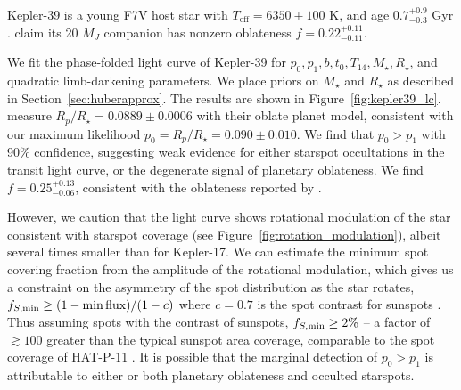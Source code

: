 Kepler-39 is a young F7V host star with $T_\mathrm{eff} = 6350 \pm 100$ K, and age $0.7^{+0.9}_{-0.3}$ Gyr \citep{Mamajek2008, Bonomo2015}. \citet{Zhu2014} claim its 20 $M_J$ companion has nonzero oblateness $f = 0.22^{+0.11}_{-0.11}$.

We fit the phase-folded \kepler light curve of Kepler-39 for $p_0, p_1, b, t_0, T_{14}, M_\star, R_\star$, and quadratic limb-darkening parameters. We place priors on $M_\star$ and $R_\star$ as described in Section~\ref{sec:huberapprox}. The results are shown in Figure~\ref{fig:kepler39_lc}. \citet{Zhu2014} measure $R_p/R_\star = 0.0889 \pm 0.0006$ with their oblate planet model, consistent with our maximum likelihood $p_0 = R_p/R_\star = 0.090 \pm 0.010$. We find that $p_0 > p_1$ with 90\% confidence, suggesting weak evidence for either starspot occultations in the transit light curve, or the degenerate signal of planetary oblateness. We find $f = {0.25}^{+0.13}_{-0.06}$, consistent with the oblateness reported by \citet{Zhu2014}.

However, we caution that the \kepler light curve shows rotational modulation of the star consistent with starspot coverage (see Figure~\ref{fig:rotation_modulation}), albeit several times smaller than for Kepler-17. We can estimate the minimum spot covering fraction from the amplitude of the rotational modulation, which gives us a constraint on the asymmetry of the spot distribution as the star rotates, $f_{S,\rm min} \geq (1 - \min{\textrm{flux}}) / (1-c)$ where $c=0.7$ is the spot contrast for sunspots \citep{Solanki2003}. Thus assuming spots with the contrast of sunspots, $f_{S,\rm min} \geq 2\%$ -- a factor of $\gtrsim 100$ greater than the typical sunspot area coverage, comparable to the spot coverage of HAT-P-11 \citep{Morris2017a}. It is possible that the marginal detection of $p_0 > p_1$ is attributable to either or both planetary oblateness and occulted starspots.

